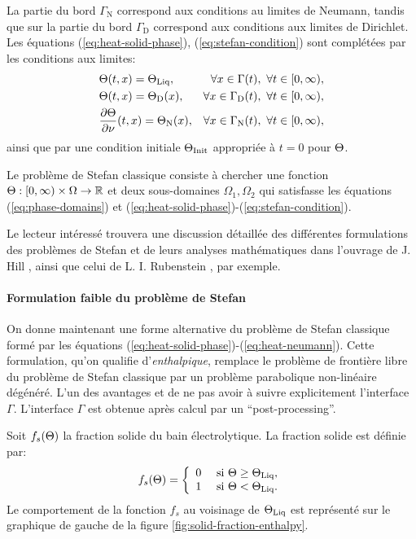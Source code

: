 La partie du bord $\Gamma_\mathrm{N}$ correspond aux conditions au
limites de Neumann, tandis que sur la partie du bord
$\Gamma_\mathrm{D}$ correspond aux conditions aux limites de
Dirichlet. Les équations (\ref{eq:heat-solid-phase}),
(\ref{eq:stefan-condition}) sont complétées par les conditions aux
limites:
\begin{align}
  &\temperature(t, x) = \tliq, %
  &\forall x \in \Gamma(t),\ \forall t \in [0,\infty),\label{eq:heat-transition}\\
  &\temperature(t, x) = \temperature_\mathrm{D}(x), %
  &\forall x \in \Gamma_\mathrm{D}(t),\ \forall t \in [0,\infty),\label{eq:heat-dirichlet}\\
  &\frac{\partial \temperature}{\partial \nu}(t, x) = \temperature_\mathrm{N}(x), %
  &\forall x \in \Gamma_\mathrm{N}(t),\ \forall t \in [0,\infty),\label{eq:heat-neumann}
\end{align}
ainsi que par une condition initiale $\Theta_\text{Init}$ appropriée à $t = 0$ pour
$\Theta$.

Le problème de Stefan classique consiste à chercher une fonction
$\Theta:[0,\infty)\times\Omega\to\mathbb R$ et deux
  sous-domaines $\Omega_1,\Omega_2$ qui satisfasse les équations
  (\ref{eq:phase-domains}) et
  (\ref{eq:heat-solid-phase})-(\ref{eq:stefan-condition}).

Le lecteur intéressé trouvera une discussion détaillée des différentes
formulations des problèmes de Stefan et de leurs analyses
mathématiques dans l'ouvrage de J. Hill \cite{HillStefanProblems},
ainsi que celui de L. I. Rubenstein \cite{Rubenstein1971}, par
exemple.

\paragraph{Formulation faible du problème de Stefan}
On donne maintenant une forme alternative du problème de Stefan
classique formé par les équations
(\ref{eq:heat-solid-phase})-(\ref{eq:heat-neumann}). Cette
formulation, qu'on qualifie d'{\em enthalpique},
remplace le problème de frontière libre du problème de Stefan
classique par un problème parabolique non-linéaire dégénéré. L'un des
avantages et de ne pas avoir à suivre explicitement l'interface
$\Gamma$. L'interface $\Gamma$ est obtenue après calcul par un
``post-processing''.

Soit $f_s(\Theta)$ la fraction solide du bain électrolytique. La
fraction solide est définie par:
\begin{equation}
  f_s(\Theta) = \left\{
  \begin{array}{ll}
    0           & \text{ si } \Theta \geq \Theta_\text{Liq},\\
    1           & \text{ si } \Theta < \Theta_\text{Liq}.
  \end{array}
  \right.
\end{equation}
Le comportement de la fonction $f_s$ au voisinage de $\Theta_\text{Liq}$ est
représenté sur le graphique de gauche de la figure
\ref{fig:solid-fraction-enthalpy}.

